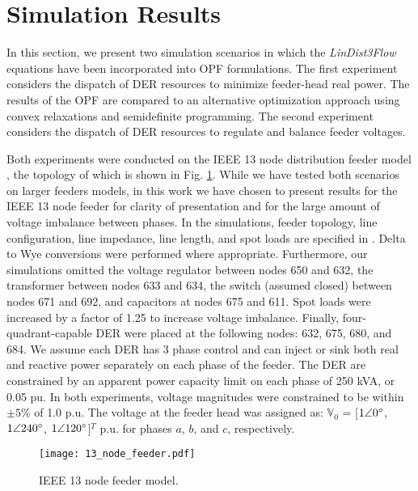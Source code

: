 \section{Simulation Results}
\label{sec:simulations}

In this section, we present two simulation scenarios in which the \textit{LinDist3Flow} equations have been incorporated into OPF formulations. The first experiment considers the dispatch of DER resources to minimize feeder-head real power.  The results of the OPF are compared to an alternative optimization approach using convex relaxations and semidefinite programming.  The second experiment considers the dispatch of DER resources to regulate and balance feeder voltages.  

Both experiments were conducted on the IEEE 13 node distribution feeder model \cite{IEEEtestfeeder}, the topology of which is shown in Fig. \ref{fig:13node}.  While we have tested both scenarios on larger feeders models, in this work we have chosen to present results for the IEEE 13 node feeder for clarity of presentation and for the large amount of voltage imbalance between phases. In the simulations, feeder topology, line configuration, line impedance, line length, and spot loads are specified in \cite{IEEEtestfeeder}. Delta to Wye conversions were performed where appropriate. Furthermore, our simulations omitted the voltage regulator between nodes 650 and 632, the transformer between nodes 633 and 634, the switch (assumed closed) between nodes 671 and 692, and capacitors at nodes 675 and 611. Spot loads were increased by a factor of 1.25 to increase voltage imbalance. Finally, four-quadrant-capable DER were placed at the following nodes: 632, 675, 680, and 684. We assume each DER has 3 phase control and can inject or sink both real and reactive power separately on each phase of the feeder.  The DER are constrained by an apparent power capacity limit on each phase of 250 kVA, or 0.05 pu.  In both experiments, voltage magnitudes were constrained to be within $\pm 5\%$ of 1.0 p.u. The voltage at the feeder head was assigned as: $\mathbb{V}_{0}$ = [$1\angle 0\degree$,  $1\angle 240 \degree$, $1\angle 120 \degree$]$^{T}$ p.u. for phases $a$, $b$, and $c$, respectively.

\begin{figure}[t]
	\centering
	\texttt{[image: 13\_node\_feeder.pdf]}
	\caption{IEEE 13 node feeder model.}
	\label{fig:13node}
\end{figure}


